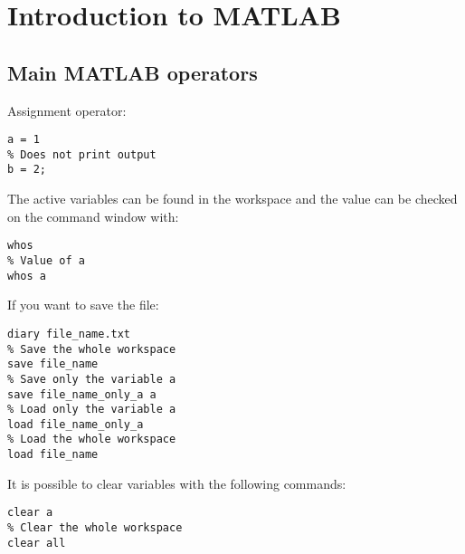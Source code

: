 \documentclass[12pt, a4paper]{report}
\begin{document}
\newpage

\tableofcontents

\newpage

\chapter{Introduction to MATLAB}
    \section{Main MATLAB operators}
    Assignment operator: 
    \begin{lstlisting}[style=Matlab]
% Print output
a = 1 
% Does not print output
b = 2;
    \end{lstlisting}
    The active variables can be found in the workspace and the value can be checked on the command window with: 
    \begin{lstlisting}[style=Matlab]
% Value of all variables
whos
% Value of a
whos a
    \end{lstlisting}
    If you want to save the file: 
    \begin{lstlisting}[style=Matlab]
% Save the command history
diary file_name.txt 
% Save the whole workspace
save file_name 
% Save only the variable a
save file_name_only_a a 
% Load only the variable a
load file_name_only_a 
% Load the whole workspace
load file_name 
    \end{lstlisting}
    It is possible to clear variables with the following commands: 
    \begin{lstlisting}[style=Matlab]
% Clear only the variable a
clear a 
% Clear the whole workspace
clear all 
    \end{lstlisting}
\end{document}
